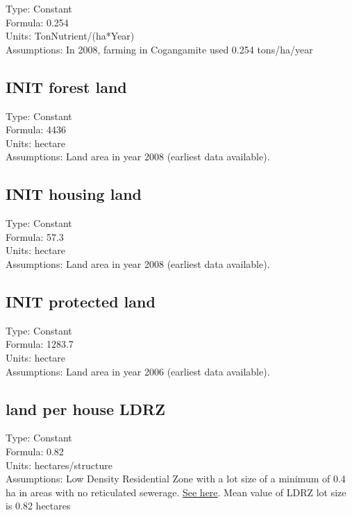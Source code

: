 \documentclass[
  11pt,
]{book}
\begin{document}
Type: Constant\\
Formula: 0.254\\
Units: TonNutrient/(ha*Year)\\
Assumptions: In 2008, farming in Cogangamite used 0.254 tons/ha/year

\hypertarget{init-forest-land}{%
\subsection{INIT forest land}\label{init-forest-land}}

Type: Constant\\
Formula: 4436\\
Units: hectare\\
Assumptions: Land area in year 2008 (earliest data available).

\hypertarget{init-housing-land}{%
\subsection{INIT housing land}\label{init-housing-land}}

Type: Constant\\
Formula: 57.3\\
Units: hectare\\
Assumptions: Land area in year 2008 (earliest data available).

\hypertarget{init-protected-land}{%
\subsection{INIT protected land}\label{init-protected-land}}

Type: Constant\\
Formula: 1283.7\\
Units: hectare\\
Assumptions: Land area in year 2006 (earliest data available).

\hypertarget{land-per-house-ldrz}{%
\subsection{land per house LDRZ}\label{land-per-house-ldrz}}

Type: Constant\\
Formula: 0.82\\
Units: hectares/structure\\
Assumptions: Low Density Residential Zone with a lot size of a minimum of 0.4 ha in areas with no reticulated sewerage. \href{https://www.planning.vic.gov.au/__data/assets/pdf_file/0026/97172/PPN37-Rural-Residential-Development_June-2015.pdf}{See here}. Mean value of LDRZ lot size is 0.82 hectares
\end{document}
